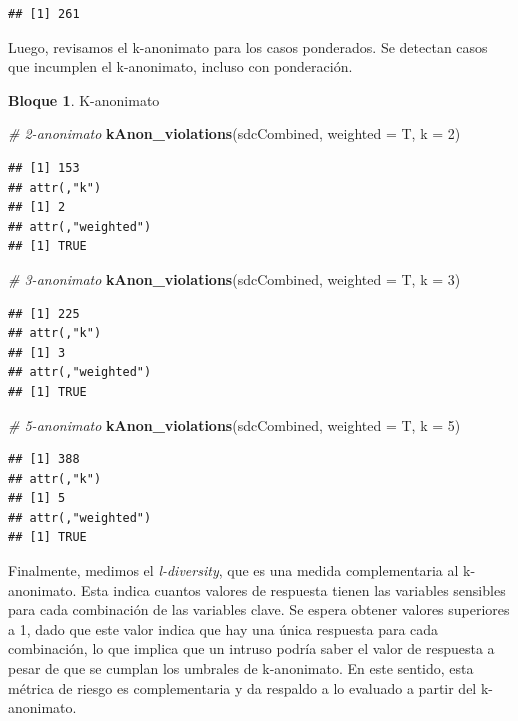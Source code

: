 \documentclass[]{book}
\newenvironment{Shaded}{\begin{snugshade}}{\end{snugshade}}
\newcommand{\CommentTok}[1]{\textcolor[rgb]{0.56,0.35,0.01}{\textit{#1}}}
\newcommand{\DataTypeTok}[1]{\textcolor[rgb]{0.13,0.29,0.53}{#1}}
\newcommand{\DecValTok}[1]{\textcolor[rgb]{0.00,0.00,0.81}{#1}}
\newcommand{\KeywordTok}[1]{\textcolor[rgb]{0.13,0.29,0.53}{\textbf{#1}}}
\newcommand{\NormalTok}[1]{#1}
\theoremstyle{definition}
\theoremstyle{definition}
\newtheorem{example}{Bloque}[chapter]
\theoremstyle{definition}
\theoremstyle{definition}
\theoremstyle{remark}
\begin{document}
\begin{verbatim}
## [1] 261
\end{verbatim}

Luego, revisamos el k-anonimato para los casos ponderados. Se detectan casos que incumplen el k-anonimato, incluso con ponderación.

\begin{example}
\protect\hypertarget{exm:bloque51nbm}{}{\label{exm:bloque51nbm} }K-anonimato
\end{example}

\begin{Shaded}
\begin{Highlighting}[]
\CommentTok{# 2-anonimato}
\KeywordTok{kAnon_violations}\NormalTok{(sdcCombined, }\DataTypeTok{weighted =}\NormalTok{ T, }\DataTypeTok{k =} \DecValTok{2}\NormalTok{) }
\end{Highlighting}
\end{Shaded}

\begin{verbatim}
## [1] 153
## attr(,"k")
## [1] 2
## attr(,"weighted")
## [1] TRUE
\end{verbatim}

\begin{Shaded}
\begin{Highlighting}[]
\CommentTok{# 3-anonimato}
\KeywordTok{kAnon_violations}\NormalTok{(sdcCombined, }\DataTypeTok{weighted =}\NormalTok{ T, }\DataTypeTok{k =} \DecValTok{3}\NormalTok{) }
\end{Highlighting}
\end{Shaded}

\begin{verbatim}
## [1] 225
## attr(,"k")
## [1] 3
## attr(,"weighted")
## [1] TRUE
\end{verbatim}

\begin{Shaded}
\begin{Highlighting}[]
\CommentTok{# 5-anonimato}
\KeywordTok{kAnon_violations}\NormalTok{(sdcCombined, }\DataTypeTok{weighted =}\NormalTok{ T, }\DataTypeTok{k =} \DecValTok{5}\NormalTok{) }
\end{Highlighting}
\end{Shaded}

\begin{verbatim}
## [1] 388
## attr(,"k")
## [1] 5
## attr(,"weighted")
## [1] TRUE
\end{verbatim}

Finalmente, medimos el \emph{l-diversity}, que es una medida complementaria al k-anonimato. Esta indica cuantos valores de respuesta tienen las variables sensibles para cada combinación de las variables clave. Se espera obtener valores superiores a 1, dado que este valor indica que hay una única respuesta para cada combinación, lo que implica que un intruso podría saber el valor de respuesta a pesar de que se cumplan los umbrales de k-anonimato. En este sentido, esta métrica de riesgo es complementaria y da respaldo a lo evaluado a partir del k-anonimato.
\end{document}
